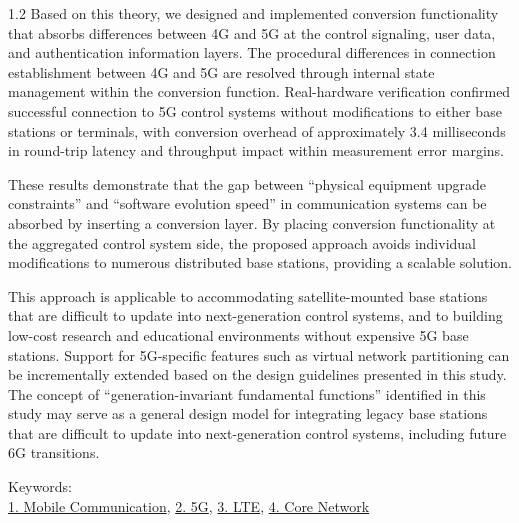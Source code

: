 \begin{spacing}{1.2}
Based on this theory, we designed and implemented conversion functionality that absorbs differences between 4G and 5G at the control signaling, user data, and authentication information layers.
The procedural differences in connection establishment between 4G and 5G are resolved through internal state management within the conversion function.
Real-hardware verification confirmed successful connection to 5G control systems without modifications to either base stations or terminals, with conversion overhead of approximately 3.4 milliseconds in round-trip latency and throughput impact within measurement error margins.

These results demonstrate that the gap between ``physical equipment upgrade constraints'' and ``software evolution speed'' in communication systems can be absorbed by inserting a conversion layer.
By placing conversion functionality at the aggregated control system side, the proposed approach avoids individual modifications to numerous distributed base stations, providing a scalable solution.

This approach is applicable to accommodating satellite-mounted base stations that are difficult to update into next-generation control systems, and to building low-cost research and educational environments without expensive 5G base stations.
Support for 5G-specific features such as virtual network partitioning can be incrementally extended based on the design guidelines presented in this study.
The concept of ``generation-invariant fundamental functions'' identified in this study may serve as a general design model for integrating legacy base stations that are difficult to update into next-generation control systems, including future 6G transitions.

\end{spacing}

\noindent Keywords:\\
\underline{1. Mobile Communication},
\underline{2. 5G},
\underline{3. LTE},
\underline{4. Core Network}
\begin{flushright}
\edept \\
\eauthor
\end{flushright}
